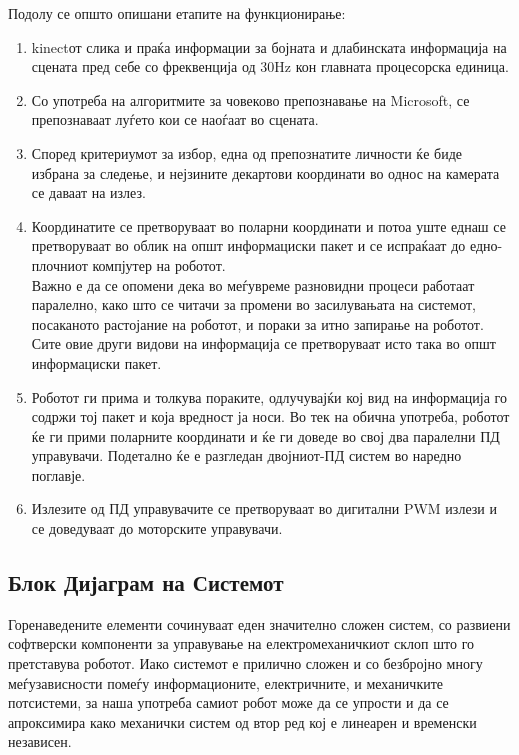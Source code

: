 \documentclass[12pt]{article}
\begin{document}
    Подолу се општо опишани етапите на функционирање:
    \renewcommand{\theenumii}{\arabic{enumii}}
    \renewcommand{\theenumiii}{\arabic{enumiii}}
    \begin{enumerate}
      \item kinectот слика и праќа информации за бојната и длабинската информација на сцената пред себе со фреквенција од 30Hz кон главната процесорска единица.
      \item Со употреба на алгоритмите за човеково препознавање на Microsoft, се препознаваат луѓето кои се наоѓаат во сцената.
      \item Според критериумот за избор, една од препознатите личности ќе биде избрана за следење, и нејзините декартови координати во однос на камерата се даваат на излез.
      \item Координатите се претворуваат во поларни координати и потоа уште еднаш се претворуваат во облик на општ информациски пакет и се испраќаат до едно-плочниот компјутер на роботот.
      \\
      Важно е да се опомени дека во меѓувреме разновидни процеси работаат паралелно, како што се читачи за промени во засилувањата на системот, посаканото растојание на роботот, и пораки за итно запирање на роботот. Сите овие други видови на информација се претворуваат исто така во општ информациски пакет.
      \item Роботот ги прима и толкува пораките, одлучувајќи кој вид на информација го содржи тој пакет и која вредност ја носи. Во тек на обична употреба, роботот ќе ги прими поларните координати и ќе ги доведе во свој два паралелни ПД управувачи. Подетално ќе е разгледан двојниот-ПД систем во наредно поглавје.
      \item Излезите од ПД управувачите се претворуваат во дигитални PWM излези и се доведуваат до моторските управувачи.
      \end{enumerate}

  \subsection{Блок Дијаграм на Системот}
    Горенаведените елементи сочинуваат еден значително сложен систем, со развиени софтверски компоненти за управување на електромеханичкиот склоп што го претставува роботот. Иако системот е прилично сложен и со безбројно многу меѓузависности помеѓу информационите, електричните, и механичките потсистеми, за наша употреба самиот робот може да се упрости и да се апроксимира како механички систем од втор ред кој е линеарен и временски независен.\\
\end{document}
